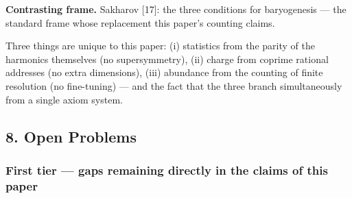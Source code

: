 \documentclass[
  a4paper,
]{article}
\begin{document}
\textbf{Contrasting frame.} Sakharov {[}17{]}: the three conditions for
baryogenesis --- the standard frame whose replacement this paper's
counting claims.

Three things are unique to this paper: (i) statistics from the parity of
the harmonics themselves (no supersymmetry), (ii) charge from coprime
rational addresses (no extra dimensions), (iii) abundance from the
counting of finite resolution (no fine-tuning) --- and the fact that the
three branch simultaneously from a single axiom system.

\subsection{8. Open Problems}\label{open-problems}

\subsubsection{First tier --- gaps remaining directly in the claims of
this
paper}\label{first-tier-gaps-remaining-directly-in-the-claims-of-this-paper}
\end{document}
